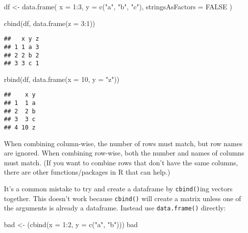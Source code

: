 \documentclass[
]{book}
\newenvironment{Shaded}{\begin{snugshade}}{\end{snugshade}}
\newcommand{\AttributeTok}[1]{\textcolor[rgb]{0.77,0.63,0.00}{#1}}
\newcommand{\ConstantTok}[1]{\textcolor[rgb]{0.00,0.00,0.00}{#1}}
\newcommand{\DecValTok}[1]{\textcolor[rgb]{0.00,0.00,0.81}{#1}}
\newcommand{\FunctionTok}[1]{\textcolor[rgb]{0.00,0.00,0.00}{#1}}
\newcommand{\NormalTok}[1]{#1}
\newcommand{\OtherTok}[1]{\textcolor[rgb]{0.56,0.35,0.01}{#1}}
\newcommand{\SpecialCharTok}[1]{\textcolor[rgb]{0.00,0.00,0.00}{#1}}
\newcommand{\StringTok}[1]{\textcolor[rgb]{0.31,0.60,0.02}{#1}}
\begin{document}
\begin{Shaded}
\begin{Highlighting}[]
\NormalTok{df }\OtherTok{\textless{}{-}} \FunctionTok{data.frame}\NormalTok{(}
  \AttributeTok{x =} \DecValTok{1}\SpecialCharTok{:}\DecValTok{3}\NormalTok{,}
  \AttributeTok{y =} \FunctionTok{c}\NormalTok{(}\StringTok{"a"}\NormalTok{, }\StringTok{"b"}\NormalTok{, }\StringTok{"c"}\NormalTok{),}
  \AttributeTok{stringsAsFactors =} \ConstantTok{FALSE}
\NormalTok{)}

\FunctionTok{cbind}\NormalTok{(df, }\FunctionTok{data.frame}\NormalTok{(}\AttributeTok{z =} \DecValTok{3}\SpecialCharTok{:}\DecValTok{1}\NormalTok{))}
\end{Highlighting}
\end{Shaded}

\begin{verbatim}
##   x y z
## 1 1 a 3
## 2 2 b 2
## 3 3 c 1
\end{verbatim}

\begin{Shaded}
\begin{Highlighting}[]
\FunctionTok{rbind}\NormalTok{(df, }\FunctionTok{data.frame}\NormalTok{(}\AttributeTok{x =} \DecValTok{10}\NormalTok{, }\AttributeTok{y =} \StringTok{"z"}\NormalTok{))}
\end{Highlighting}
\end{Shaded}

\begin{verbatim}
##    x y
## 1  1 a
## 2  2 b
## 3  3 c
## 4 10 z
\end{verbatim}

When combining column-wise, the number of rows must match, but row names are ignored. When combining row-wise, both the number and names of columns must match. (If you want to combine rows that don't have the same columns, there are other functions/packages in R that can help.)

It's a common mistake to try and create a dataframe by \texttt{cbind()}ing vectors together. This doesn't work because \texttt{cbind()} will create a matrix unless one of the arguments is already a dataframe. Instead use \texttt{data.frame()} directly:

\begin{Shaded}
\begin{Highlighting}[]
\NormalTok{bad }\OtherTok{\textless{}{-}}\NormalTok{ (}\FunctionTok{cbind}\NormalTok{(}\AttributeTok{x =} \DecValTok{1}\SpecialCharTok{:}\DecValTok{2}\NormalTok{, }\AttributeTok{y =} \FunctionTok{c}\NormalTok{(}\StringTok{"a"}\NormalTok{, }\StringTok{"b"}\NormalTok{)))}
\NormalTok{bad}
\end{Highlighting}
\end{Shaded}
\end{document}
